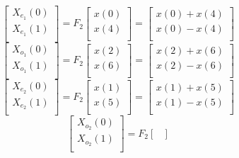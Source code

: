 \documentclass[journal,12pt,twocolumn]{IEEEtran}
\renewcommand\thesection{\arabic{section}}
\begin{document}
\begin{enumerate}[label=\thesection.\arabic*.,ref=\thesection.\theenumi]
\begin{equation}
\begin{bmatrix}
X_{e_{1}}(0) \\ 
X_{e_{1}}(1)\\ 
\end{bmatrix}
= F_{2}
\begin{bmatrix}
x(0) \\ 
x(4) \\ 
\end{bmatrix}
=
\begin{bmatrix}
x(0)+x(4) \\ 
x(0)-x(4) \\ 
\end{bmatrix}
\end{equation}
\begin{equation}
\begin{bmatrix}
X_{o_{1}}(0) \\ 
X_{o_{1}}(1)\\ 
\end{bmatrix}
= F_{2}
\begin{bmatrix}
x(2) \\ 
x(6) \\ 
\end{bmatrix}
=
\begin{bmatrix}
x(2)+x(6) \\ 
x(2)-x(6) \\ 
\end{bmatrix}
\end{equation}
\begin{equation}
\begin{bmatrix}
X_{e_{2}}(0) \\ 
X_{e_{2}}(1)\\ 
\end{bmatrix}
= F_{2}
\begin{bmatrix}
x(1) \\ 
x(5) \\ 
\end{bmatrix}
=
\begin{bmatrix}
x(1)+x(5) \\ 
x(1)-x(5) \\ 
\end{bmatrix}
\end{equation}
\begin{equation}
\begin{bmatrix}
X_{o_{2}}(0) \\ 
X_{o_{2}}(1)\\ 
\end{bmatrix}
= F_{2}
\begin{bmatrix}

\end{bmatrix}
\end{equation}
\end{enumerate}
\end{document}
